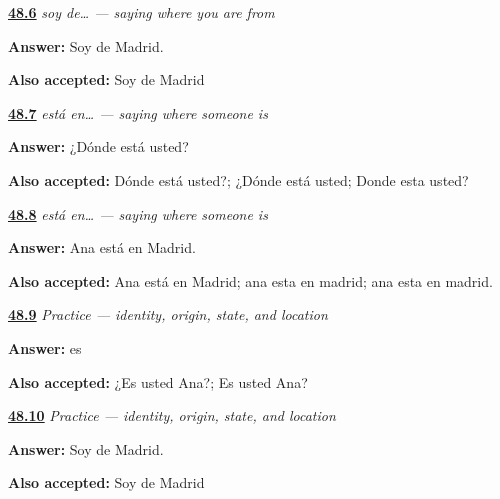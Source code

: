 \noindent\begin{minipage}[t]{\linewidth}
\raggedright
\hyperlink{review-ES-C09-soy-de-madrid}{\textbf{48.6}} \emph{soy de… — saying where you are from}\par
\small \textbf{Answer:} Soy de Madrid.\par
\footnotesize \textbf{Also accepted:} Soy de Madrid
\end{minipage}\par\medskip

\noindent\begin{minipage}[t]{\linewidth}
\raggedright
\hyperlink{review-ES-C09-esta-en-ask-formal}{\textbf{48.7}} \emph{está en… — saying where someone is}\par
\small \textbf{Answer:} ¿Dónde está usted?\par
\footnotesize \textbf{Also accepted:} Dónde está usted?; ¿Dónde está usted; Donde esta usted?
\end{minipage}\par\medskip

\noindent\begin{minipage}[t]{\linewidth}
\raggedright
\hyperlink{review-ES-C09-esta-en-ana}{\textbf{48.8}} \emph{está en… — saying where someone is}\par
\small \textbf{Answer:} Ana está en Madrid.\par
\footnotesize \textbf{Also accepted:} Ana está en Madrid; ana esta en madrid; ana esta en madrid.
\end{minipage}\par\medskip

\noindent\begin{minipage}[t]{\linewidth}
\raggedright
\hyperlink{review-ES-C09-practice-identity}{\textbf{48.9}} \emph{Practice — identity, origin, state, and location}\par
\small \textbf{Answer:} es\par
\footnotesize \textbf{Also accepted:} ¿Es usted Ana?; Es usted Ana?
\end{minipage}\par\medskip

\noindent\begin{minipage}[t]{\linewidth}
\raggedright
\hyperlink{review-ES-C09-practice-origin}{\textbf{48.10}} \emph{Practice — identity, origin, state, and location}\par
\small \textbf{Answer:} Soy de Madrid.\par
\footnotesize \textbf{Also accepted:} Soy de Madrid
\end{minipage}\par\medskip

